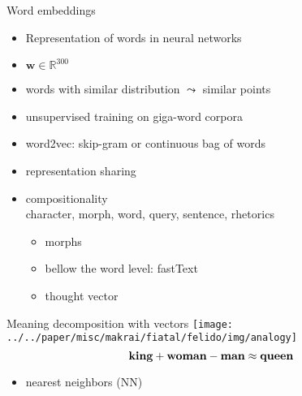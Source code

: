 \documentclass[10pt]{beamer}%
\begin{document}
\begin{frame}{Word embeddings}
  \begin{itemize}
    \item Representation of words in neural networks
    \item $\mathbf w \in \mathbb R^{300}$
    \item words with similar distribution $\leadsto$ similar points
    \item unsupervised training on giga-word corpora
    \item word2vec: skip-gram or continuous bag of words \\ \citep{Mikolov:2013d}
    \item representation sharing \\ \citep{Collobert:2011,Hashimoto:2017}
    \item compositionality \\ character, morph, word, query, sentence, rhetorics
      \begin{itemize}
        \item morphs \citep{Lazaridou:2013}
        \item bellow the word level: fastText \citep{Bojanowski:2016}
        \item thought vector \citep{Vaswani:2017}
      \end{itemize}
  \end{itemize}
\end{frame}

\begin{frame}{Meaning decomposition with vectors}
  \cite{Katz:1963,Mikolov:2013l}
  \texttt{[image: ../../paper/misc/makrai/fiatal/felido/img/analogy]}
  \[ \text{\bf king} + \text{\bf woman} - \text{\bf man} \approx \text{\bf queen}\]
      \begin{itemize}
        \item nearest neighbors (NN)
      \end{itemize}
\end{frame}
\end{document}
